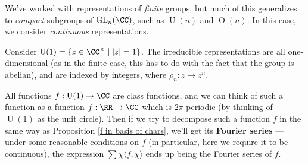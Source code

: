 We've worked with representations of \emph{finite} groups, but much of this generalizes to \emph{compact} subgroups of $\operatorname{GL}_n(\CC)$, such as $\operatorname{U}(n)$ and $\operatorname{O}(n)$. In this case, we consider \emph{continuous} representations. 

\begin{example}
Consider $\operatorname{U}(1) = \{z \in \CC^\times \mid \lvert z \rvert = 1\}$. The irreducible representations are all one-dimensional (as in the finite case, this has to do with the fact that the group is abelian), and are indexed by integers, where $\rho_n : z \mapsto z^n$. 

All functions $f : \operatorname{U}(1) \to \CC$ are class functions, and we can think of such a function as a function $f : \RR \to \CC$ which is $2\pi$-periodic (by thinking of $\operatorname{U}(1)$ as the unit circle). Then if we try to decompose such a function $f$ in the same way as Proposition \ref{f in basis of chars}, we'll get its \textbf{Fourier series} --- under some reasonable conditions on $f$ (in particular, here we require it to be continuous), the expression $\sum \chi \langle f, \chi \rangle$ ends up being the Fourier series of $f$. 
\end{example}





